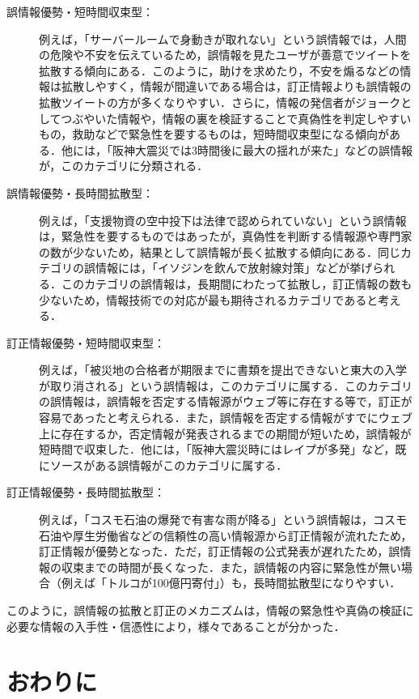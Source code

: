 \documentclass[japanese]{jnlp_1.4}
\begin{document}
\begin{description}
 \item[誤情報優勢・短時間収束型：]例えば，「サーバールームで身動きが取れない」という誤情報では，人間の危険や不安を伝えているため，誤情報を見たユーザが善意でツイートを拡散する傾向にある．このように，助けを求めたり，不安を煽るなどの情報は拡散しやすく，情報が間違いである場合は，訂正情報よりも誤情報の拡散ツイートの方が多くなりやすい．さらに，情報の発信者がジョークとしてつぶやいた情報や，情報の裏を検証することで真偽性を判定しやすいもの，救助などで緊急性を要するものは，短時間収束型になる傾向がある．他には，「阪神大震災では3時間後に最大の揺れが来た」などの誤情報が，このカテゴリに分類される．

 \item[誤情報優勢・長時間拡散型：]例えば，「支援物資の空中投下は法律で認められていない」という誤情報は，緊急性を要するものではあったが，真偽性を判断する情報源や専門家の数が少ないため，結果として誤情報が長く拡散する傾向にある．同じカテゴリの誤情報には，「イソジンを飲んで放射線対策」などが挙げられる．このカテゴリの誤情報は，長期間にわたって拡散し，訂正情報の数も少ないため，情報技術での対応が最も期待されるカテゴリであると考える．

 \item[訂正情報優勢・短時間収束型：]例えば，「被災地の合格者が期限までに書類を提出できないと東大の入学が取り消される」という誤情報は，このカテゴリに属する．このカテゴリの誤情報は，誤情報を否定する情報源がウェブ等に存在する等で，訂正が容易であったと考えられる．また，誤情報を否定する情報がすでにウェブ上に存在するか，否定情報が発表されるまでの期間が短いため，誤情報が短時間で収束した．他には，「阪神大震災時にはレイプが多発」など，既にソースがある誤情報がこのカテゴリに属する．
 \item[訂正情報優勢・長時間拡散型：]例えば，「コスモ石油の爆発で有害な雨が降る」という誤情報は，コスモ石油や厚生労働省などの信頼性の高い情報源から訂正情報が流れたため，訂正情報が優勢となった．ただ，訂正情報の公式発表が遅れたため，誤情報の収束までの時間が長くなった．また，誤情報の内容に緊急性が無い場合（例えば「トルコが100億円寄付」）も，長時間拡散型になりやすい．
\end{description}

このように，誤情報の拡散と訂正のメカニズムは，情報の緊急性や真偽の検証に必要な情報の入手性・信憑性により，様々であることが分かった．



\section{おわりに}
\end{document}
